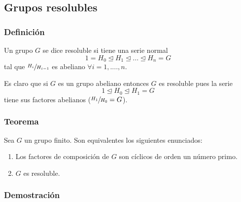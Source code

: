 \documentclass[11pt,a4paper]{article}
\begin{document}

\subsection{Grupos resolubles}

\subsubsection*{Definición}

Un grupo $G$ se dice resoluble si tiene una serie normal
$$1 = H_{0} \unlhd H_{1} \unlhd ... \unlhd H_{n} = G$$
tal que $\sfrac{H_{i}}{H_{i-1}}$ es abeliano $\forall i = 1, ...., n$.

Es claro que si $G$ es un grupo abeliano entonces $G$ es resoluble pues la serie
$$1 \unlhd H_{0} \unlhd H_{1} = G$$
tiene sus factores abelianos ($\sfrac{H_{1}}{H_{0}} = G$).

\subsubsection*{Teorema}

Sea $G$ un grupo finito. Son equivalentes los siguientes enunciados:
\begin{enumerate}[label = (\roman*)]
\item Los factores de composición de $G$ son cíclicos de orden un número primo.
\item $G$ es resoluble.
\end{enumerate}

\subsubsection*{Demostración}
\end{document}
